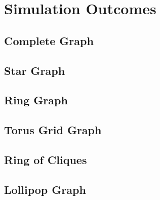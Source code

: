 \chapter{Simulation Outcomes}\label{chap:simulationoutcomes}

\section{Complete Graph}\label{sec:completeGraph}
\section{Star Graph}\label{sec:stargraph}
\section{Ring Graph}\label{sec:ringgraph}
\section{Torus Grid Graph}\label{sec:torusgridGraph}
\section{Ring of Cliques}\label{sec:ringofcliques}
\section{Lollipop Graph}\label{sec:lollipopgraph}
